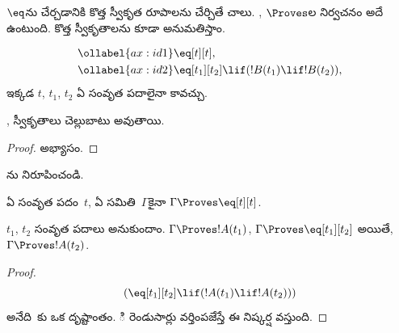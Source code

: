\documentclass[../../../include/open-logic-section]{subfiles}
\begin{document}


 $\eq$ను చేర్చడానికి కొత్త స్వీకృత
రూపాలను చేర్చితే చాలు. , $\Proves$ల నిర్వచనం
అదే ఉంటుంది. కొత్త స్వీకృతాలను కూడా అనుమతిస్తాం.

\begin{defn}
\begin{align}
\ollabel{ax:id1} & \eq[t][t], \\
\ollabel{ax:id2} & \eq[t_1][t_2] \lif (!B(t_1) \lif
  !B(t_2)),
\end{align}
ఇక్కడ $t$, $t_1$, $t_2$ ఏ సంవృత పదాలైనా కావచ్చు.
\end{defn}

\begin{prop}
  ,  స్వీకృతాలు చెల్లుబాటు అవుతాయి.
\end{prop}

\begin{proof}
  అభ్యాసం.
\end{proof}

\begin{prob}
ను నిరూపించండి.
\end{prob}

\begin{prop}
 ఏ సంవృత పదం~$t$, ఏ సమితి~$\Gamma$కైనా $\Gamma \Proves \eq[t][t]$.
\end{prop}

\begin{prop} $t_1$, $t_2$ సంవృత పదాలు అనుకుందాం.
  $\Gamma \Proves !A(t_1)$, $\Gamma \Proves \eq[t_1][t_2]$ అయితే,
  $\Gamma \Proves !A(t_2)$.
\end{prop}

\begin{proof}
\[
(\eq[t_1][t_2] \lif (!A(t_1) \lif !A(t_2)))
\]
అనేది~కు ఒక దృష్టాంతం. ి రెండుసార్లు వర్తింపజేస్తే
ఈ నిష్కర్ష వస్తుంది.
\end{proof}
\end{document}
